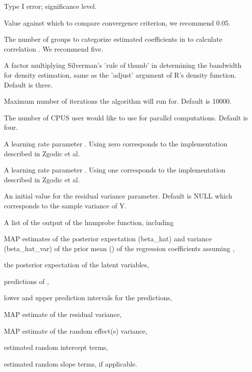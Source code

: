 \documentclass[a4paper]{book}
\begin{document}
\begin{Arguments}
\begin{ldescription}
\item[\code{alpha}] Type I error; significance level.

\item[\code{ep}] Value against which to compare convergence criterion, we recommend 0.05.

\item[\code{B}] The number of groups to categorize estimated coefficients in to calculate correlation \eqn{\rho}{}. We recommend five.

\item[\code{adj}] A factor multiplying Silverman’s 'rule of thumb' in determining the bandwidth for density estimation, same as the 'adjust' argument of R's density function. Default is three.

\item[\code{maxit}] Maximum number of iterations the algorithm will run for. Default is 10000.

\item[\code{cpus}] The number of CPUS user would like to use for parallel computations. Default is four.

\item[\code{LR}] A learning rate parameter . Using zero corresponds to the implementation described in Zgodic et al.

\item[\code{C}] A learning rate parameter . Using one corresponds to the implementation described in Zgodic et al.

\item[\code{sigma\_init}] An initial value for the residual variance parameter. Default is NULL which corresponds to the sample variance of Y.
\end{ldescription}
\end{Arguments}
%
\begin{Value}
A list of the output of the lmmprobe function, including

 MAP estimates of the posterior expectation (beta\_hat) and variance (beta\_hat\_var) of the prior mean (\eqn{\beta}{}) of the regression coefficients assuming ,

 the posterior expectation of the latent \eqn{\gamma}{} variables,

 predictions of ,

 lower and upper prediction intervals for the predictions,

 MAP estimate of the residual variance,

 MAP estimate of the random effect(s) variance,

 estimated random intercept terms,

 estimated random slope terms, if applicable.
\end{Value}
\end{document}
